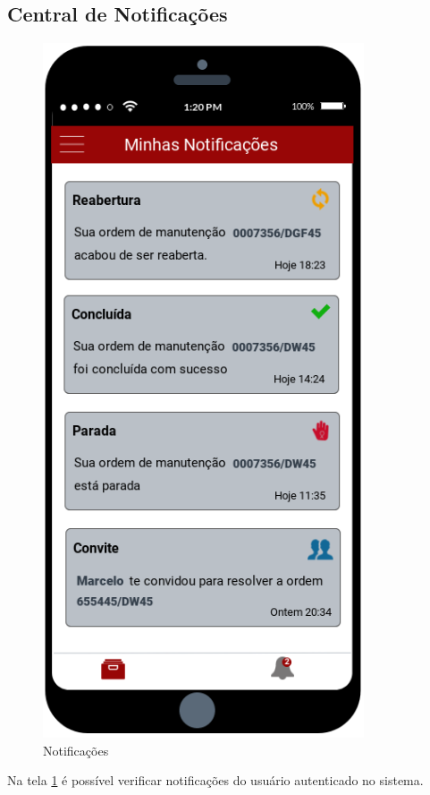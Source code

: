 \subsection{Central de Notificações}

\begin{figure}[H]
	\caption{\label{mobile_notificacao}Notificações}
	\begin{center}
		\includegraphics[scale=0.80]{./Figuras/mobile/notificacao.png}
	\end{center}
\end{figure}

Na tela \ref{mobile_notificacao} é possível verificar notificações do usuário autenticado no sistema.

